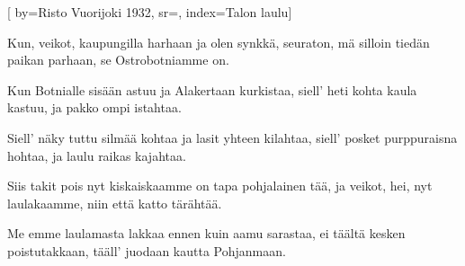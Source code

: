 
[
	by={Risto Vuorijoki 1932},
	sr={},
	index={Talon laulu}]

\beginverse*
Kun, veikot, kaupungilla harhaan
ja olen synkkä, seuraton,
mä silloin tiedän paikan parhaan,
se Ostrobotniamme on.
\endverse

\beginverse*
Kun Botnialle sisään astuu
ja Alakertaan kurkistaa,
siell' heti kohta kaula kastuu,
ja pakko ompi istahtaa.
\endverse

\beginverse*
Siell' näky tuttu silmää kohtaa
ja lasit yhteen kilahtaa,
siell' posket purppuraisna hohtaa,
ja laulu raikas kajahtaa.
\endverse

\beginverse*
Siis takit pois nyt kiskaiskaamme
on tapa pohjalainen tää,
ja veikot, hei, nyt laulakaamme,
niin että katto tärähtää.
\endverse

\beginverse*
Me emme laulamasta lakkaa
ennen kuin aamu sarastaa,
ei täältä kesken poistutakkaan,
tääll' juodaan kautta Pohjanmaan.
\endverse
\endsong